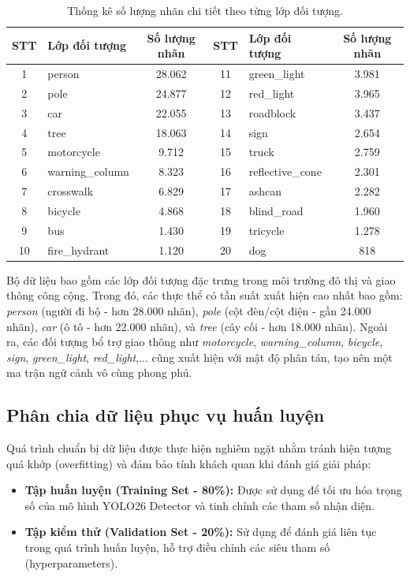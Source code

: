 \begin{table}[H] %
    \centering
    \caption{Thống kê số lượng nhãn chi tiết theo từng lớp đối tượng.}
    \label{tab:wotr_classes_instances}
    \begin{tabular}{clcclc}
        \toprule
        \textbf{STT} & \textbf{Lớp đối tượng} & \textbf{Số lượng nhãn} & \textbf{STT} & \textbf{Lớp đối tượng} & \textbf{Số lượng nhãn} \\
        \midrule
        1  & person          & 28.062 & 11 & green\_light    & 3.981 \\
        2  & pole            & 24.877 & 12 & red\_light      & 3.965 \\
        3  & car             & 22.055 & 13 & roadblock       & 3.437 \\
        4  & tree            & 18.063 & 14 & sign            & 2.654 \\
        5  & motorcycle      & 9.712  & 15 & truck           & 2.759 \\
        6  & warning\_column & 8.323  & 16 & reflective\_cone& 2.301 \\
        7  & crosswalk       & 6.829  & 17 & ashcan          & 2.282 \\
        8  & bicycle         & 4.868  & 18 & blind\_road     & 1.960 \\
        9  & bus             & 1.430  & 19 & tricycle        & 1.278 \\
        10 & fire\_hydrant   & 1.120  & 20 & dog             & 818   \\
        \bottomrule
    \end{tabular}
\end{table}

Bộ dữ liệu bao gồm các lớp đối tượng đặc trưng trong môi trường đô thị và giao thông công cộng. Trong đó, các thực thể có tần suất xuất hiện cao nhất bao gồm: \textit{person} (người đi bộ - hơn 28.000 nhãn), \textit{pole} (cột đèn/cột điện - gần 24.000 nhãn), \textit{car} (ô tô - hơn 22.000 nhãn), và \textit{tree} (cây cối - hơn 18.000 nhãn). Ngoài ra, các đối tượng bổ trợ giao thông như \textit{motorcycle}, \textit{warning\_column}, \textit{bicycle}, \textit{sign}, \textit{green\_light}, \textit{red\_light},... cũng xuất hiện với mật độ phân tán, tạo nên một ma trận ngữ cảnh vô cùng phong phú.

\subsection{Phân chia dữ liệu phục vụ huấn luyện}
Quá trình chuẩn bị dữ liệu được thực hiện nghiêm ngặt nhằm tránh hiện tượng quá khớp (overfitting) và đảm bảo tính khách quan khi đánh giá giải pháp:
\begin{itemize}
    \item \textbf{Tập huấn luyện (Training Set - 80\%):} Được sử dụng để tối ưu hóa trọng số của mô hình YOLO26 Detector và tinh chỉnh các tham số nhận diện.
    \item \textbf{Tập kiểm thử (Validation Set - 20\%):} Sử dụng để đánh giá liên tục trong quá trình huấn luyện, hỗ trợ điều chỉnh các siêu tham số (hyperparameters).
\end{itemize}

